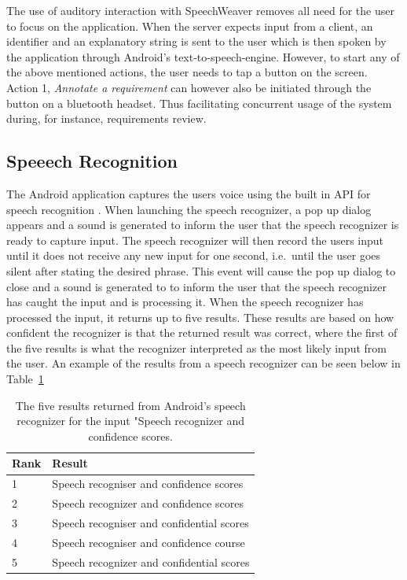 The use of auditory interaction with SpeechWeaver removes all need for the user to focus on the application. When the server expects input from a client, an identifier and an explanatory string is sent to the user which is then spoken by the application through Android's text-to-speech-engine. However, to start any of the above mentioned actions, the user needs to tap a button on the screen. Action 1, \emph{Annotate a requirement} can however also be initiated through the button on a bluetooth headset.
Thus facilitating concurrent usage of the system during, for instance, requirements review.
\subsection{Speeech Recognition}
\label{sec:sr}
The Android application captures the users voice using the built in API for speech recognition \citep{recAPI}.
When launching the speech recognizer, a pop up dialog appears and a sound is generated to inform the user that the speech recognizer is ready to capture input.
The speech recognizer will then record the users input until it does not receive any new input for one second, i.e.\ until the user goes silent after stating the desired phrase. 
This event will cause the pop up dialog to close and a sound is generated to to inform the user that the speech recognizer has caught the input and is processing it. 
When the speech recognizer has processed the input, it returns up to five results. 
These results are based on how confident the recognizer is that the returned result was correct, where the first of the five results is what the recognizer interpreted as the most likely input from the user. An example of the results from a speech recognizer can be seen below in Table~\ref{tab:fiveresults}

\begin{table}[h]
\centering
\caption{The five results returned from Android's speech recognizer for the input "Speech recognizer and confidence scores.}
    \begin{tabular}{ l  l }
        \hline
        Rank & Result \\
        \hline
        1 & Speech recogniser and confidence scores \\
        2 & Speech recognizer and confidence scores\\
        3 & Speech recogniser and confidential scores\\
        4 & Speech recogniser and confidence course\\
        5 & Speech recognizer and confidential scores\\
        \end{tabular}
\label{tab:fiveresults}
\end{table}

